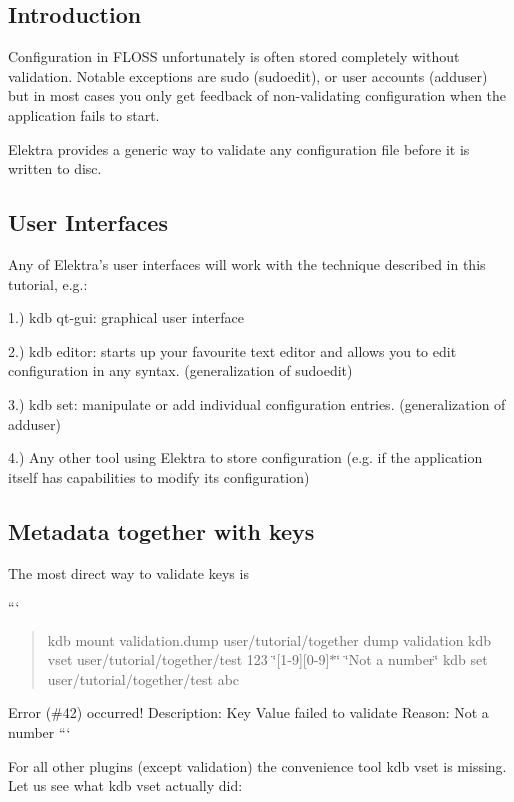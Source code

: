 \subsection*{Introduction}

Configuration in F\+L\+O\+S\+S unfortunately is often stored completely without validation. Notable exceptions are sudo ({\ttfamily sudoedit}), or user accounts ({\ttfamily adduser}) but in most cases you only get feedback of non-\/validating configuration when the application fails to start.

Elektra provides a generic way to validate any configuration file before it is written to disc.

\subsection*{User Interfaces}

Any of Elektra's user interfaces will work with the technique described in this tutorial, e.\+g.\+:

1.) {\ttfamily kdb qt-\/gui}\+: graphical user interface

2.) {\ttfamily kdb editor}\+: starts up your favourite text editor and allows you to edit configuration in any syntax. (generalization of {\ttfamily sudoedit})

3.) {\ttfamily kdb set}\+: manipulate or add individual configuration entries. (generalization of {\ttfamily adduser})

4.) Any other tool using Elektra to store configuration (e.\+g. if the application itself has capabilities to modify its configuration)

\subsection*{Metadata together with keys}

The most direct way to validate keys is

``` \begin{quote}
kdb mount validation.\+dump user/tutorial/together dump validation kdb vset user/tutorial/together/test 123 \char`\"{}\mbox{[}1-\/9\mbox{]}\mbox{[}0-\/9\mbox{]}$\ast$\char`\"{} \char`\"{}\+Not a number\char`\"{} kdb set user/tutorial/together/test abc \end{quote}
Error (\#42) occurred! Description\+: Key Value failed to validate Reason\+: Not a number ```

For all other plugins (except {\ttfamily validation}) the convenience tool {\ttfamily kdb vset} is missing. Let us see what {\ttfamily kdb vset} actually did\+:

